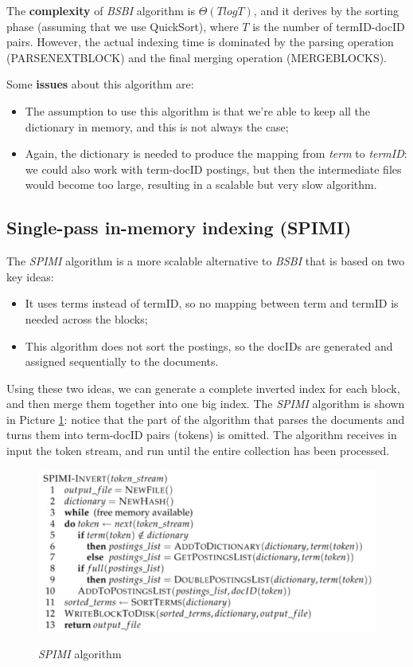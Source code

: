 The \textbf{complexity} of \textit{BSBI} algorithm is $\Theta(T log T)$, and it derives by the sorting phase (assuming that we use QuickSort), where $T$ is the number of termID-docID pairs. However, the actual indexing time is dominated by the parsing operation (PARSENEXTBLOCK) and the final merging operation (MERGEBLOCKS). 

Some \textbf{issues} about this algorithm are:

\begin{itemize}
    \item The assumption to use this algorithm is that we're able to keep all the dictionary in memory, and this is not always the case;
    \item Again, the dictionary is needed to produce the mapping from \textit{term} to \textit{termID}: we could also work with term-docID postings, but then the intermediate files would become too large, resulting in a scalable but very slow algorithm.
\end{itemize}

\subsection{Single-pass in-memory indexing (SPIMI)}
The \textit{SPIMI} algorithm is a more scalable alternative to \textit{BSBI} that is based on two key ideas:

\begin{itemize}
    \item It uses terms instead of termID, so no mapping between term and termID is needed across the blocks;
    \item This algorithm does not sort the postings, so the docIDs are generated and assigned sequentially to the documents.
\end{itemize}

Using these two ideas, we can generate a complete inverted index for each block, and then merge them together into one big index. The \textit{SPIMI} algorithm is shown in Picture \ref{spimi}: notice that the part of the algorithm that parses the documents and turns them into term-docID pairs (tokens) is omitted. The algorithm receives in input the token stream, and run until the entire collection has been processed.

\begin{figure}[h!]
		\centering
		\includegraphics[scale = 1.5]{img/spimi.jpg}
		\label{spimi}
        \caption{\textit{SPIMI} algorithm}
\end{figure}

